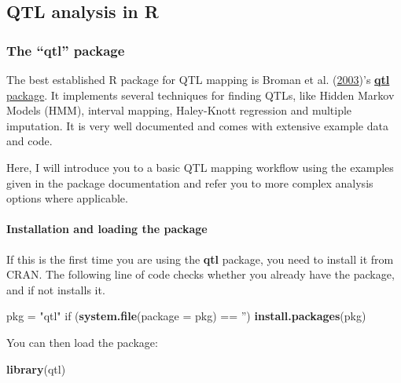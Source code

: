 \documentclass[12pt,]{book}
\newenvironment{Shaded}{\begin{snugshade}}{\end{snugshade}}
\newcommand{\KeywordTok}[1]{\textcolor[rgb]{0.13,0.29,0.53}{\textbf{{#1}}}}
\newcommand{\DataTypeTok}[1]{\textcolor[rgb]{0.13,0.29,0.53}{{#1}}}
\newcommand{\StringTok}[1]{\textcolor[rgb]{0.31,0.60,0.02}{{#1}}}
\newcommand{\NormalTok}[1]{{#1}}
\let\oldparagraph\paragraph
\renewcommand{\paragraph}[1]{\oldparagraph{#1}\mbox{}}
\theoremstyle{definition}
\theoremstyle{definition}
\theoremstyle{remark}
\begin{document}
\subsection{QTL analysis in R}\label{qtl-analysis-in-r}

\subsubsection{\texorpdfstring{The ``qtl''
package}{The qtl package}}\label{the-qtl-package}

The best established R package for QTL mapping is Broman et al.
(\protect\hyperlink{ref-Broman2003}{2003})'s
\href{http://www.rqtl.org/}{\textbf{qtl} package}. It implements several
techniques for finding QTLs, like Hidden Markov Models (HMM), interval
mapping, Haley-Knott regression and multiple imputation. It is very well
documented and comes with extensive example data and code.

Here, I will introduce you to a basic QTL mapping workflow using the
examples given in the package documentation and refer you to more
complex analysis options where applicable.

\paragraph{Installation and loading the package}\label{installation-and-loading-the-package}

If this is the first time you are using the \textbf{qtl} package, you
need to install it from CRAN. The following line of code checks whether
you already have the package, and if not installs it.

\begin{Shaded}
\begin{Highlighting}[]
\NormalTok{pkg =}\StringTok{ "qtl"}
\NormalTok{if (}\KeywordTok{system.file}\NormalTok{(}\DataTypeTok{package =} \NormalTok{pkg) ==}\StringTok{ ''}\NormalTok{) }\KeywordTok{install.packages}\NormalTok{(pkg)}
\end{Highlighting}
\end{Shaded}

You can then load the package:

\begin{Shaded}
\begin{Highlighting}[]
\KeywordTok{library}\NormalTok{(qtl)}
\end{Highlighting}
\end{Shaded}
\end{document}
